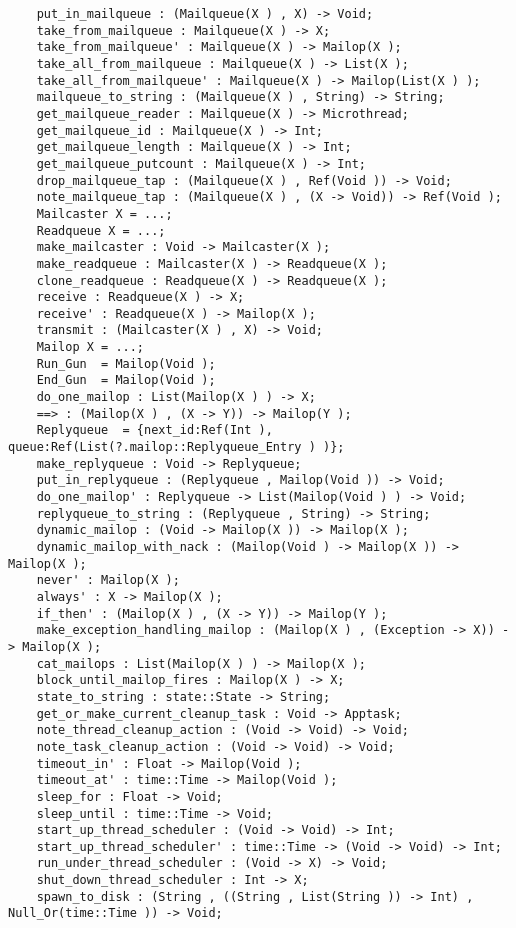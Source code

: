 \begin{verbatim}
    put_in_mailqueue : (Mailqueue(X ) , X) -> Void;
    take_from_mailqueue : Mailqueue(X ) -> X;
    take_from_mailqueue' : Mailqueue(X ) -> Mailop(X );
    take_all_from_mailqueue : Mailqueue(X ) -> List(X );
    take_all_from_mailqueue' : Mailqueue(X ) -> Mailop(List(X ) );
    mailqueue_to_string : (Mailqueue(X ) , String) -> String;
    get_mailqueue_reader : Mailqueue(X ) -> Microthread;
    get_mailqueue_id : Mailqueue(X ) -> Int;
    get_mailqueue_length : Mailqueue(X ) -> Int;
    get_mailqueue_putcount : Mailqueue(X ) -> Int;
    drop_mailqueue_tap : (Mailqueue(X ) , Ref(Void )) -> Void;
    note_mailqueue_tap : (Mailqueue(X ) , (X -> Void)) -> Ref(Void );
    Mailcaster X = ...;
    Readqueue X = ...;
    make_mailcaster : Void -> Mailcaster(X );
    make_readqueue : Mailcaster(X ) -> Readqueue(X );
    clone_readqueue : Readqueue(X ) -> Readqueue(X );
    receive : Readqueue(X ) -> X;
    receive' : Readqueue(X ) -> Mailop(X );
    transmit : (Mailcaster(X ) , X) -> Void;
    Mailop X = ...;
    Run_Gun  = Mailop(Void );
    End_Gun  = Mailop(Void );
    do_one_mailop : List(Mailop(X ) ) -> X;
    ==> : (Mailop(X ) , (X -> Y)) -> Mailop(Y );
    Replyqueue  = {next_id:Ref(Int ), queue:Ref(List(?.mailop::Replyqueue_Entry ) )};
    make_replyqueue : Void -> Replyqueue;
    put_in_replyqueue : (Replyqueue , Mailop(Void )) -> Void;
    do_one_mailop' : Replyqueue -> List(Mailop(Void ) ) -> Void;
    replyqueue_to_string : (Replyqueue , String) -> String;
    dynamic_mailop : (Void -> Mailop(X )) -> Mailop(X );
    dynamic_mailop_with_nack : (Mailop(Void ) -> Mailop(X )) -> Mailop(X );
    never' : Mailop(X );
    always' : X -> Mailop(X );
    if_then' : (Mailop(X ) , (X -> Y)) -> Mailop(Y );
    make_exception_handling_mailop : (Mailop(X ) , (Exception -> X)) -> Mailop(X );
    cat_mailops : List(Mailop(X ) ) -> Mailop(X );
    block_until_mailop_fires : Mailop(X ) -> X;
    state_to_string : state::State -> String;
    get_or_make_current_cleanup_task : Void -> Apptask;
    note_thread_cleanup_action : (Void -> Void) -> Void;
    note_task_cleanup_action : (Void -> Void) -> Void;
    timeout_in' : Float -> Mailop(Void );
    timeout_at' : time::Time -> Mailop(Void );
    sleep_for : Float -> Void;
    sleep_until : time::Time -> Void;
    start_up_thread_scheduler : (Void -> Void) -> Int;
    start_up_thread_scheduler' : time::Time -> (Void -> Void) -> Int;
    run_under_thread_scheduler : (Void -> X) -> Void;
    shut_down_thread_scheduler : Int -> X;
    spawn_to_disk : (String , ((String , List(String )) -> Int) , Null_Or(time::Time )) -> Void;

\end{verbatim}
